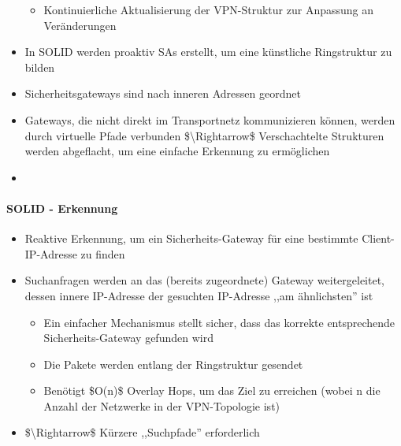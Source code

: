 \documentclass[a4paper]{article}
\begin{document}
\begin{multicols}{3}
\begin{itemize}
              \begin{itemize}
                  \item
                        Kontinuierliche Aktualisierung der VPN-Struktur zur Anpassung an
                        Veränderungen
              \end{itemize}
        \item
              In SOLID werden proaktiv SAs erstellt, um eine künstliche Ringstruktur
              zu bilden
        \item
              Sicherheitsgateways sind nach inneren Adressen geordnet
        \item
              Gateways, die nicht direkt im Transportnetz kommunizieren können,
              werden durch virtuelle Pfade verbunden \$\textbackslash Rightarrow\$
              Verschachtelte Strukturen werden abgeflacht, um eine einfache
              Erkennung zu ermöglichen
        \item
    \end{itemize}


    \paragraph{SOLID - Erkennung}

    \begin{itemize}
        \item
              Reaktive Erkennung, um ein Sicherheits-Gateway für eine bestimmte
              Client-IP-Adresse zu finden
        \item
              Suchanfragen werden an das (bereits zugeordnete) Gateway
              weitergeleitet, dessen innere IP-Adresse der gesuchten IP-Adresse ,,am
              ähnlichsten'' ist

              \begin{itemize}
                  \item
                        Ein einfacher Mechanismus stellt sicher, dass das korrekte
                        entsprechende Sicherheits-Gateway gefunden wird
                  \item
                        Die Pakete werden entlang der Ringstruktur gesendet
                  \item
                        Benötigt \$O(n)\$ Overlay Hops, um das Ziel zu erreichen (wobei n
                        die Anzahl der Netzwerke in der VPN-Topologie ist)
              \end{itemize}
        \item
              \$\textbackslash Rightarrow\$ Kürzere ,,Suchpfade'' erforderlich
    \end{itemize}



\end{multicols}
\end{document}
